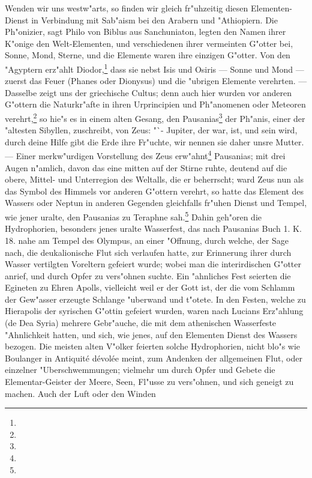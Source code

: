 \documentclass[a4paper, 11pt, oneside, polutonikogreek, german]{article}
\begin{document}
Wenden wir uns westw"arts, so finden wir gleich fr"uhzeitig diesen Elementen-Dienst in Verbindung mit Sab"aism bei den Arabern und "Athiopiern. Die Ph"onizier, sagt Philo von Biblus aus Sanchuniaton, legten den Namen ihrer K"onige den Welt-Elementen, und verschiedenen ihrer vermeinten G"otter bei, Sonne, Mond, Sterne, und die Elemente waren ihre einzigen G"otter. Von den "Agyptern erz"ahlt Diodor,\footnote{} dass sie nebst Isis und Osiris --- Sonne und Mond --- zuerst das Feuer (Phanes oder Dionysus) und die "ubrigen Elemente verehrten. --- Dasselbe zeigt uns der griechische Cultus; denn auch hier wurden vor anderen G"ottern die Naturkr"afte in ihren Urprincipien und Ph"anomenen oder Meteoren verehrt,\footnote{} so hie"s es in einem alten Gesang, den Pausanias\footnote{} der Ph"anis, einer der "altesten Sibyllen, zuschreibt, von Zeus: "`- Jupiter, der war, ist, und sein wird, durch deine Hilfe gibt die Erde ihre Fr"uchte, wir nennen sie daher unsre Mutter. --- Einer merkw"urdigen Vorstellung des Zeus erw"ahnt\footnote{} Pausanias; mit drei Augen n"amlich, davon das eine mitten auf der Stirne ruhte, deutend auf die obere, Mittel- und Unterregion des Weltalls, die er beherrscht; ward Zeus nun als das Symbol des Himmels vor anderen G"ottern verehrt, so hatte das Element des Wassers oder Neptun in anderen Gegenden gleichfalls fr"uhen Dienst und Tempel, wie jener uralte, den Pausanias zu Teraphne sah.\footnote{} Dahin geh"oren die Hydrophorien, besonders jenes uralte Wasserfest, das nach Pausanias Buch 1. K. 18. nahe am Tempel des Olympus, an einer "Offnung, durch welche, der Sage nach, die deukalionische Flut sich verlaufen hatte, zur Erinnerung ihrer durch Wasser vertilgten Voreltern gefeiert wurde; wobei man die interirdischen G"otter anrief, und durch Opfer zu vers"ohnen suchte. Ein "ahnliches Fest seierten die Egineten zu Ehren Apolls, vielleicht weil er der Gott ist, der die vom Schlamm der Gew"asser erzeugte Schlange "uberwand und t"otete. In den Festen, welche zu Hierapolis der syrischen G"ottin gefeiert wurden, waren nach Lucians Erz"ahlung (de Dea Syria) mehrere Gebr"auche, die mit dem athenischen Wasserfeste "Ahnlichkeit hatten, und sich, wie jenes, auf den Elementen Dienst des Wassers bezogen. Die meisten alten V"olker feierten solche Hydrophorien, nicht blo"s wie Boulanger in Antiquité dévolée meint, zum Andenken der allgemeinen Flut, oder einzelner "Uberschwemmungen; vielmehr um durch Opfer und Gebete die Elementar-Geister der Meere, Seen, Fl"usse zu vers"ohnen, und sich geneigt zu machen. Auch der Luft oder den Winden 
\end{document}
